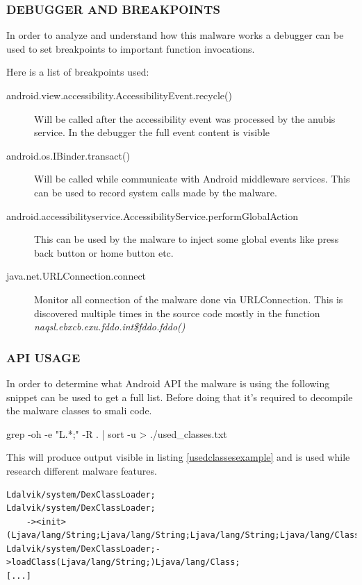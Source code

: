 \documentclass[10pt,titlepage]{article}
\begin{document}
\subsubsection{DEBUGGER AND BREAKPOINTS}
In order to analyze and understand how this malware works a debugger can be used to set breakpoints to important function invocations.

Here is a list of breakpoints used:

\begin{description}
\item[android.view.accessibility.AccessibilityEvent.recycle()] Will be called after the accessibility event was processed by the anubis service. In the debugger the full event content is visible
\item[android.os.IBinder.transact()] Will be called while communicate with Android middleware services. This can be used to record system calls made by the malware.
\item[android.accessibilityservice.AccessibilityService.performGlobalAction] This can be used by the malware to inject some global events like press back button or home button etc.
\item[java.net.URLConnection.connect] Monitor all connection of the malware done via URLConnection. This is discovered multiple times in the source code mostly in the function \textit{naqsl.ebxcb.exu.fddo.int\$fddo.fddo()}
\end{description}

\subsubsection{API USAGE}
In order to determine what Android API the malware is using the following snippet can be used to get a full list. Before doing that it's required to decompile the malware classes to smali code.

\begin{spverbatim}
grep -oh -e "L.*;"  -R . | sort -u > ./used_classes.txt
\end{spverbatim}

This will produce output visible in listing \ref{usedclassesexample} and is used while research different malware features.

\begin{lstlisting}[label=usedclassesexample,caption=Example output of the API usage script.,frame=tb]
Ldalvik/system/DexClassLoader;
Ldalvik/system/DexClassLoader;
    -><init>(Ljava/lang/String;Ljava/lang/String;Ljava/lang/String;Ljava/lang/ClassLoader;
Ldalvik/system/DexClassLoader;->loadClass(Ljava/lang/String;)Ljava/lang/Class;
[...]
\end{lstlisting}
\end{document}
